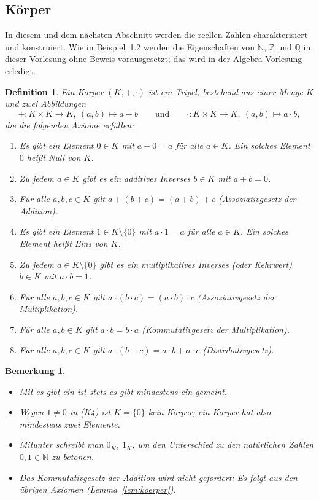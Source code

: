 \documentclass[a4paper]{article}
\theoremstyle{kurzskript}
\newtheorem{definition}[satz]{Definition}
\newtheorem*{bem}{Bemerkung}
\newcommand{\N}{\mathbb{N}}
\newcommand{\Z}{\mathbb{Z}}
\newcommand{\Q}{\mathbb{Q}}
\begin{document}
\subsection{Körper}

In diesem und dem nächsten Abschnitt werden die reellen Zahlen charakterisiert und konstruiert. Wie in Beispiel~1.2 werden die Eigenschaften von $\N$, $\Z$ und $\Q$ in dieser Vorlesung ohne Beweis vorausgesetzt; das wird in der Algebra-Vorlesung erledigt.

\begin{definition}
Ein \emph{Körper} $(K, +, \cdot)$ ist ein Tripel, bestehend aus einer Menge $K$ und zwei Abbildungen
\[
  +\colon K \times K \to K,\ (a, b) \mapsto a + b
  \qquad\text{und}\qquad
  \cdot\colon K \times K \to K,\ (a, b) \mapsto a \cdot b,
\]
die die folgenden Axiome erfüllen:
\begin{enumerate}[label=(K\arabic*)]
  \item Es gibt ein Element $0 \in K$ mit $a + 0 = a$ für alle $a \in K$. Ein solches Element $0$ heißt \emph{Null} von $K$.
  \item Zu jedem $a \in K$ gibt es ein \emph{additives Inverses} $b \in K$ mit $a + b = 0$.
  \item Für alle $a, b, c \in K$ gilt $a + (b + c) = (a + b) + c$ \hfill (Assoziativgesetz der Addition).
  \item Es gibt ein Element $1 \in K \setminus \{0\}$ mit $a \cdot 1 = a$ für alle $a \in K$. Ein solches Element heißt \emph{Eins} von $K$.
  \item Zu jedem $a \in K \setminus \{0\}$ gibt es ein \emph{multiplikatives Inverses} (oder \emph{Kehrwert}) $b \in K$ mit $a \cdot b = 1$.
  \item Für alle $a, b, c \in K$ gilt $a \cdot (b \cdot c) = (a \cdot b) \cdot c$ \hfill (Assoziativgesetz der Multiplikation).
  \item Für alle $a, b \in K$ gilt $a \cdot b = b \cdot a$ \hfill (Kommutativgesetz der Multiplikation).
  \item Für alle $a, b, c \in K$ gilt $a \cdot (b + c) = a \cdot b + a \cdot c$ \hfill (Distributivgesetz).
\end{enumerate}
\end{definition}

\begin{bem}
\leavevmode
\begin{itemize}
  \item Mit \glqq es gibt ein\grqq{} ist stets \glqq es gibt \emph{mindestens} ein\grqq{} gemeint.
  \item Wegen $1 \neq 0$ in (K4) ist $K = \{0\}$ kein Körper; ein Körper hat also mindestens zwei Elemente.
  \item Mitunter schreibt man $0_K$, $1_K$, um den Unterschied zu den natürlichen Zahlen $0, 1 \in \N$ zu betonen.
  \item Das Kommutativgesetz der Addition wird nicht gefordert: Es folgt aus den übrigen Axiomen (Lemma~\ref{lem:koerper}).
\end{itemize}
\end{bem}
\end{document}

